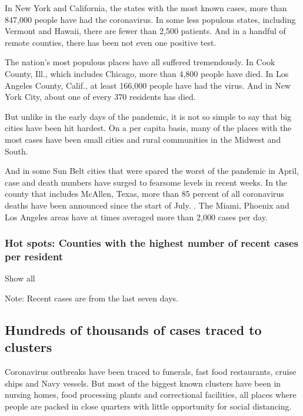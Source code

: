 In New York and California, the states with the most known cases, more
than 847,000 people have had the coronavirus. In some less populous
states, including Vermont and Hawaii, there are fewer than 2,500
patients. And in a handful of remote counties, there has been not even
one positive test.

The nation's most populous places have all suffered tremendously. In
Cook County, Ill., which includes Chicago, more than 4,800 people have
died. In Los Angeles County, Calif., at least 166,000 people have had
the virus. And in New York City, about one of every 370 residents has
died.

But unlike in the early days of the pandemic, it is not so simple to say
that big cities have been hit hardest. On a per capita basis, many of
the places with the most cases have been small cities and rural
communities in the Midwest and South.

And in some Sun Belt cities that were spared the worst of the pandemic
in April, case and death numbers have surged to fearsome levels in
recent weeks. In the county that includes McAllen, Texas, more than 85
percent of all coronavirus deaths have been announced since the start of
July. . The Miami, Phoenix and Los Angeles areas have at times averaged
more than 2,000 cases per day.

\hypertarget{hot-spots-counties-with-the-highest-number-of-recent-cases-per-resident}{%
\subsubsection{Hot spots: Counties with the highest number of recent
cases per
resident}\label{hot-spots-counties-with-the-highest-number-of-recent-cases-per-resident}}

Show all

Note: Recent cases are from the last seven days.

\hypertarget{hundreds-of-thousands-of-cases-traced-to-clusters}{%
\subsection{Hundreds of thousands of cases traced to
clusters}\label{hundreds-of-thousands-of-cases-traced-to-clusters}}

Coronavirus outbreaks have been traced to funerals, fast food
restaurants, cruise ships and Navy vessels. But most of the biggest
known clusters have been in nursing homes, food processing plants and
correctional facilities, all places where people are packed in close
quarters with little opportunity for social distancing.

